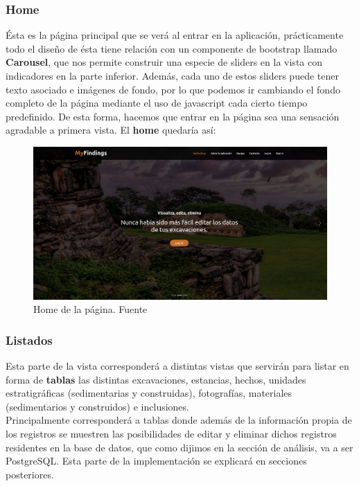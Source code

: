     \subsubsection{Home}
    Ésta es la página principal que se verá al entrar en la aplicación, prácticamente todo el
    diseño de ésta tiene relación con un componente de bootstrap llamado \textbf{Carousel}, que
    nos permite construir una especie de sliders en la vista con indicadores en la parte
    inferior. Además, cada uno de estos sliders puede tener texto asociado e imágenes de fondo,
    por lo que podemos ir cambiando el fondo completo de la página mediante el uso de javascript
    cada cierto tiempo predefinido. De esta forma, hacemos que entrar en la página sea una
    sensación agradable a primera vista. El \textbf{home} quedaría así:
    
        \begin{figure}[H]
            \centering
            \includegraphics[scale=0.19]{imagenes/home.png}
            \caption[Home de la página]{Home de la página. Fuente \cite{maya}}
            \label{fig:home}
        \end{figure}

    \subsubsection{Listados}
    Esta parte de la vista corresponderá a distintas vistas que servirán para listar en forma
    de \textbf{tablas} las distintas excavaciones, estancias, hechos, unidades estratigráficas
    (sedimentarias y construidas), fotografías, materiales (sedimentarios y construidos) e
    inclusiones.\\

    Principalmente corresponderá a tablas donde además de la información propia
    de los registros se muestren las posibilidades de editar y eliminar dichos registros
    residentes en la base de datos, que como dijimos en la sección de análisis, va a ser
    PostgreSQL. Esta parte de la implementación se explicará en secciones posteriores.

